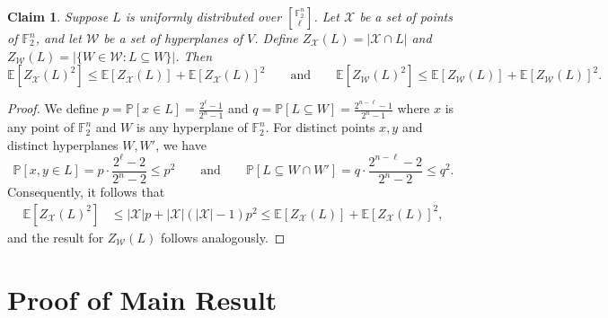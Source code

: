 \documentclass[11pt]{article}
\newtheorem{claim}[thm]{Claim}
\newcommand\E{\mathbb{E}}
\renewcommand\leq{\leqslant}
\providecommand{\sqbinom}[2]{\genfrac{[}{]}{0pt}{}{#1}{#2}}
\begin{document}
\begin{claim}\label{claim:second-moment-bounds}
 Suppose  $L$ is uniformly distributed over ${\sqbinom{\mathbb{F}_2^n}{\ell}}$. Let $\mathcal{X}$ be
  a set of points of $\mathbb{F}_2^n$, and let $\mathcal{W}$ be a set of hyperplanes of $V$.
  Define $ Z_{\mathcal{X}}(L)=|\mathcal{X}\cap L|$ and  $Z_{\mathcal{W}}(L)=|\{W\in\mathcal{W}:L\subseteq W\}|$. Then 
  \begin{equation*}
    \E[Z_{\mathcal{X}}(L)^2]
    \leq
    \E[Z_{\mathcal{X}}(L)]+\E[Z_{\mathcal{X}}(L)]^2
    \qquad\text{and}\qquad
    \E[Z_{\mathcal{W}}(L)^2]
    \leq
    \E[Z_{\mathcal{W}}(L)]+\E[Z_{\mathcal{W}}(L)]^2.
  \end{equation*}
\end{claim}

\begin{proof}
  We define $  p=\mathbb{P}[x\in L]=\frac{2^\ell-1}{2^n-1}$ and $q=\mathbb{P}[L\subseteq W]=\frac{2^{n-\ell}-1}{2^n-1}$ where $x$ is any point of $\mathbb{F}_2^n$ and $W$ is any hyperplane of $\mathbb{F}_2^n$.  For distinct points $x,y$ and distinct hyperplanes $W,W'$, we have 
  \[
    \mathbb{P}[x,y\in L]
    =
    p \cdot \frac{2^\ell-2}{2^n-2}
    \leq p^2
    \qquad\text{and}\qquad
    \mathbb{P}[L\subseteq W\cap W']
    =
    q\cdot \frac{2^{n-\ell}-2}{2^n-2}
    \leq q^2.
  \]
  Consequently, it follows that 
  \begin{align*}
    \E[Z_{\mathcal{X}}(L)^2]
    &\leq |\mathcal{X}|p+|\mathcal{X}|(|\mathcal{X}|-1)p^2
    \leq \E[Z_{\mathcal{X}}(L)]+\E[Z_{\mathcal{X}}(L)]^2,
  \end{align*}
  and the result for $Z_{\mathcal{W}}(L)$ follows analogously. 
\end{proof}


\section{Proof of Main Result}
\end{document}
